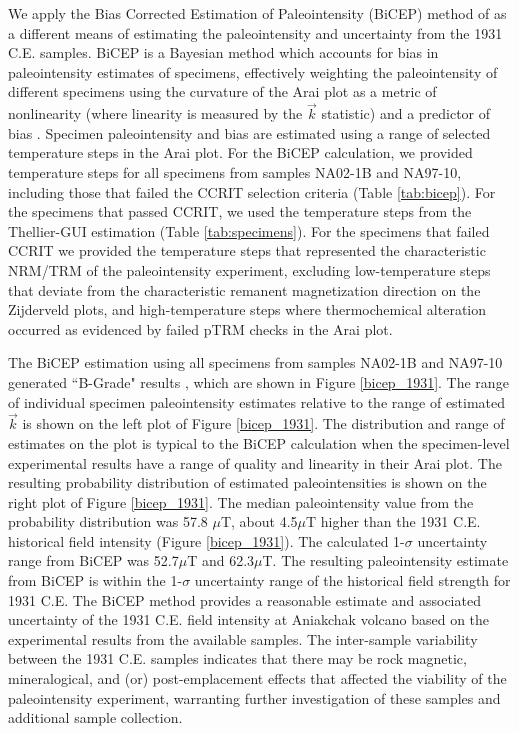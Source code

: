 \documentclass[draft]{agujournal2019}
\begin{document}
We apply the Bias Corrected Estimation of Paleointensity (BiCEP) method of  as a different means of estimating the paleointensity and uncertainty from the 1931 C.E. samples. BiCEP is a Bayesian method which accounts for bias in paleointensity estimates of specimens, effectively weighting the paleointensity of different specimens using the curvature of the Arai plot as a metric of nonlinearity (where linearity is measured by the $\vec{k}$ statistic) and a predictor of bias \cite{Cych2021a}. Specimen paleointensity and bias are estimated using a range of selected temperature steps in the Arai plot. For the BiCEP calculation, we provided temperature steps for all specimens from samples NA02-1B and NA97-10, including those that failed the CCRIT selection criteria (Table \ref{tab:bicep}). For the specimens that passed CCRIT, we used the temperature steps from the Thellier-GUI estimation (Table \ref{tab:specimens}). For the specimens that failed CCRIT we provided the temperature steps that represented the characteristic NRM/TRM of the paleointensity experiment, excluding low-temperature steps that deviate from the characteristic remanent magnetization direction on the Zijderveld plots, and high-temperature steps where thermochemical alteration occurred as evidenced by failed pTRM checks in the Arai plot. 

The BiCEP estimation using all specimens from samples NA02-1B and NA97-10 generated ``B-Grade" results \cite{Cych2021a}, which are shown in Figure \ref{bicep_1931}. The range of individual specimen paleointensity estimates relative to the range of estimated $\vec{k}$ is shown on the left plot of Figure \ref{bicep_1931}. The distribution and range of estimates on the plot is typical to the BiCEP calculation when the specimen-level experimental results have a range of quality and linearity in their Arai plot. The resulting probability distribution of estimated paleointensities is shown on the right plot of Figure \ref{bicep_1931}. The median paleointensity value from the probability distribution was 57.8 $\mu$T, about 4.5$\mu$T higher than the 1931 C.E. historical field intensity (Figure \ref{bicep_1931}). The calculated 1-$\sigma$ uncertainty range from BiCEP was 52.7$\mu$T and 62.3$\mu$T. The resulting paleointensity estimate from BiCEP is within the 1-$\sigma$ uncertainty range of the historical field strength for 1931 C.E. The BiCEP method provides a reasonable estimate and associated uncertainty of the 1931 C.E. field intensity at Aniakchak volcano based on the experimental results from the available samples. The inter-sample variability between the 1931 C.E. samples indicates that there may be rock magnetic, mineralogical, and (or) post-emplacement effects  that affected the viability of the paleointensity experiment, warranting further investigation of these samples and additional sample collection.
\end{document}

